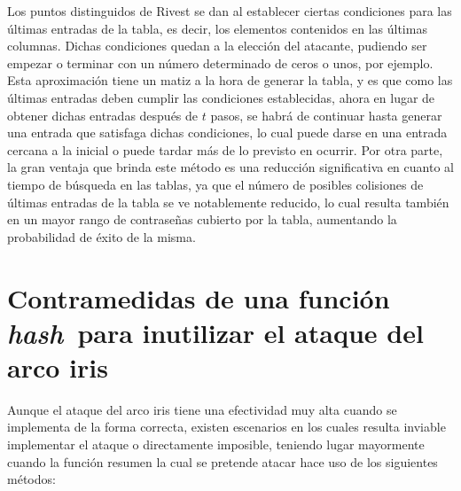 \documentclass[12pt,spanish,listoffigures,listoftables]{tfgetsinf}
\newcommand{\hash}{\textit{hash}}
\begin{document}
Los puntos distinguidos de Rivest se dan al establecer ciertas condiciones para las últimas entradas de la tabla, es decir, los elementos contenidos en las últimas columnas. Dichas condiciones quedan a la elección del atacante, pudiendo ser empezar o terminar con un número determinado de ceros o unos, por ejemplo. Esta aproximación tiene un matiz a la hora de generar la tabla, y es que como las últimas entradas deben cumplir las condiciones establecidas, ahora en lugar de obtener dichas entradas después de $t$ pasos, se habrá de continuar hasta generar una entrada que satisfaga dichas condiciones, lo cual puede darse en una entrada cercana a la inicial o puede tardar más de lo previsto en ocurrir. Por otra parte, la gran ventaja que brinda este método es una reducción significativa en cuanto al tiempo de búsqueda en las tablas, ya que el número de posibles colisiones de últimas entradas de la tabla se ve notablemente reducido, lo cual resulta también en un mayor rango de contraseñas cubierto por la tabla, aumentando la probabilidad de éxito de la misma.

\section{Contramedidas de una función \hash~para inutilizar el ataque del arco iris} \label{salt}

Aunque el ataque del arco iris tiene una efectividad muy alta cuando se implementa de la forma correcta, existen escenarios en los cuales resulta inviable implementar el ataque o directamente imposible, teniendo lugar mayormente cuando la función resumen la cual se pretende atacar hace uso de los siguientes métodos:
\end{document}
